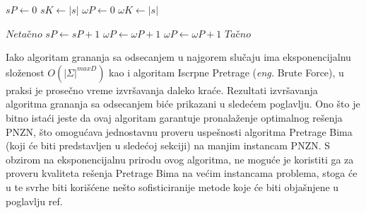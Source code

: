 \documentclass[12pt,oneside]{memoir}
\begin{document}
  \begin{algorithm}
    \caption{$\textbf{Podniska}\bm{(s,\omega)}$}
    \label{alg:podNiska}
    \begin{algorithmic}[1]
    \State $sP \gets 0$ 
    \State $sK \gets |s|$ 
    \State $\omega P \gets 0$ 
    \State $\omega K \gets |s|$ 

    \State
        \State \Return $Neta\textrm{č}no$
        \State $sP \gets sP + 1$
        \State $\omega P \gets \omega P + 1$
      \Else
        \State $\omega P \gets \omega P + 1$
      \EndIf
    \EndWhile
    \State
    \State \Return $Ta\textrm{č}no$
    \end{algorithmic}
    \end{algorithm}
Iako algoritam grananja sa odsecanjem u najgorem slučaju ima eksponencijalnu složenost $O(|\Sigma|^{maxD})$
kao i algoritam Iscrpne Pretrage (\textit{eng.} Brute Force), u praksi je prosečno vreme izvršavanja
daleko kraće. Rezultati izvršavanja algoritma grananja sa odsecanjem biće prikazani u sledećem poglavlju.
Ono što je bitno istaći jeste da ovaj algoritam garantuje pronalaženje optimalnog rešenja PNZN, što omogućava
jednostavnu proveru uspešnosti algoritma Pretrage Bima (koji će biti predstavljen u sledećoj sekciji)
na manjim instancam PNZN. S obzirom na eksponencijalnu prirodu ovog algoritma, ne moguće je koristiti ga
za proveru kvaliteta rešenja Pretrage Bima na većim instancama problema, stoga će u te svrhe biti korišćene
nešto sofisticiranije metode koje će biti objašnjene u poglavlju ref.

\end{document}
